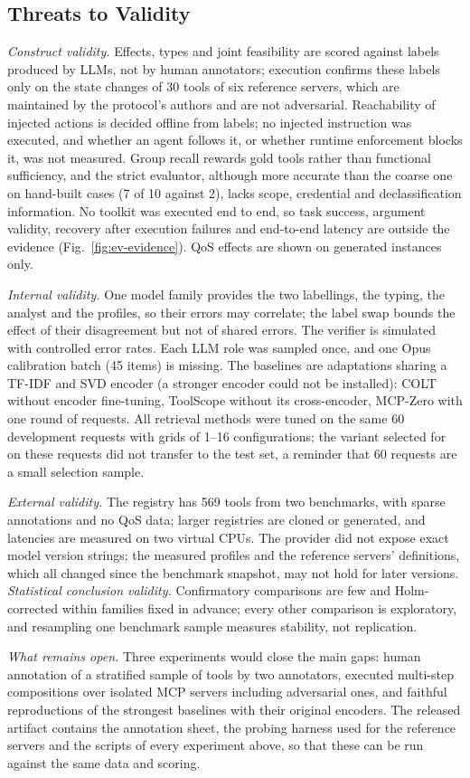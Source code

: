 \subsection{Threats to Validity}
\label{sec:ev-threats}

\emph{Construct validity.} Effects, types and joint feasibility are scored against labels produced by LLMs, not by
human annotators; execution confirms these labels only on the state changes of 30 tools of six reference
servers, which are maintained by the protocol's authors and are not adversarial. Reachability of injected actions
is decided offline from labels; no injected instruction was executed, and whether an agent follows it, or whether
runtime enforcement blocks it, was not measured. Group recall rewards gold tools rather than functional
sufficiency, and the strict evaluator, although more accurate than the coarse one on hand-built cases (7 of 10
against 2), lacks scope, credential and declassification information. No toolkit was executed end to end, so task
success, argument validity, recovery after execution failures and end-to-end latency are outside the evidence
(Fig.~\ref{fig:ev-evidence}). QoS effects are shown on generated instances only.

\emph{Internal validity.} One model family provides the two labellings, the typing, the analyst and the profiles,
so their errors may correlate; the label swap bounds the effect of their disagreement but not of shared errors.
The verifier is simulated with controlled error rates. Each LLM role was sampled once, and one Opus calibration
batch (45 items) is missing. The baselines are adaptations sharing a TF-IDF and SVD encoder (a stronger encoder
could not be installed): COLT without encoder fine-tuning, ToolScope without its cross-encoder, MCP-Zero with one
round of requests. All retrieval methods were tuned on the same 60 development requests with grids of 1--16
configurations; the variant selected for \pamcp{} on these requests did not transfer to the test set, a reminder
that 60 requests are a small selection sample.

\emph{External validity.} The registry has 569 tools from two benchmarks, with sparse annotations and no QoS data;
larger registries are cloned or generated, and latencies are measured on two virtual CPUs. The provider did not
expose exact model version strings; the measured profiles and the reference servers' definitions, which all
changed since the benchmark snapshot, may not hold for later versions. \emph{Statistical conclusion validity.}
Confirmatory comparisons are few and Holm-corrected within families fixed in advance; every other comparison is
exploratory, and resampling one benchmark sample measures stability, not replication.

\emph{What remains open.} Three experiments would close the main gaps: human annotation of a stratified sample of
tools by two annotators, executed multi-step compositions over isolated MCP servers including adversarial ones,
and faithful reproductions of the strongest baselines with their original encoders. The released artifact
contains the annotation sheet, the probing harness used for the reference servers and the scripts of every
experiment above, so that these can be run against the same data and scoring.
